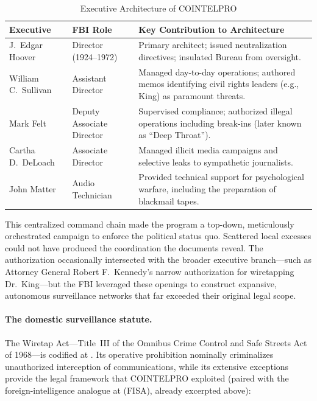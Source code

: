 \begin{table}[htbp]
\centering
\small
\caption{Executive Architecture of COINTELPRO}
\label{tab:cointelpro_executives}
\begin{tabular}{>{\raggedright}p{3cm} >{\raggedright}p{4cm} >{\raggedright\arraybackslash}p{7cm}}
\toprule
\textbf{Executive} & \textbf{FBI Role} & \textbf{Key Contribution to Architecture} \\
\midrule
J.\ Edgar Hoover & Director (1924--1972) & Primary architect; issued neutralization directives; insulated Bureau from oversight. \\
William C.\ Sullivan & Assistant Director & Managed day-to-day operations; authored memos identifying civil rights leaders (e.g., King) as paramount threats. \\
Mark Felt & Deputy Associate Director & Supervised compliance; authorized illegal operations including break-ins (later known as ``Deep Throat''). \\
Cartha D.\ DeLoach & Associate Director & Managed illicit media campaigns and selective leaks to sympathetic journalists. \\
John Matter & Audio Technician & Provided technical support for psychological warfare, including the preparation of blackmail tapes. \\
\bottomrule
\end{tabular}
\end{table}

This centralized command chain made the program a top-down, meticulously orchestrated campaign to enforce the political status quo. Scattered local excesses could not have produced the coordination the documents reveal. The authorization occasionally intersected with the broader executive branch---such as Attorney General Robert F.\ Kennedy's narrow authorization for wiretapping Dr.\ King---but the FBI leveraged these openings to construct expansive, autonomous surveillance networks that far exceeded their original legal scope.

\paragraph{The domestic surveillance statute.}
The Wiretap Act---Title~III of the Omnibus Crime Control and Safe Streets Act of 1968---is codified at . Its operative prohibition nominally criminalizes unauthorized interception of communications, while its extensive exceptions provide the legal framework that COINTELPRO exploited (paired with the foreign-intelligence analogue at  (FISA), already excerpted above):

